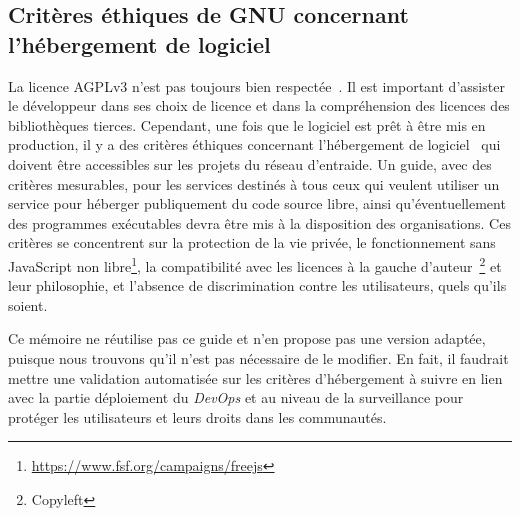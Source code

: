 
\subsection{Critères éthiques de GNU concernant l'hébergement de logiciel}

La licence AGPLv3 n’est pas toujours bien respectée~\cite{violation_libre_2017}. Il est important d'assister le développeur dans ses choix de licence et dans la compréhension des licences des bibliothèques tierces. Cependant, une fois que le logiciel est prêt à être mis en production, il y a des critères éthiques concernant l'hébergement de logiciel~\cite{gnu_critere_hebergement_2022} qui doivent être accessibles sur les projets du réseau d’entraide. Un guide, avec des critères mesurables, pour les services destinés à tous ceux qui veulent utiliser un service pour héberger publiquement du code source libre, ainsi qu'éventuellement des programmes exécutables devra être mis à la disposition des organisations. Ces critères se concentrent sur la protection de la vie privée, le fonctionnement sans JavaScript non libre\footnote{\url{https://www.fsf.org/campaigns/freejs}}, la compatibilité avec les licences à la gauche d'auteur~\footnote{Copyleft} et leur philosophie, et l'absence de discrimination contre les utilisateurs, quels qu'ils soient.

Ce mémoire ne réutilise pas ce guide et n'en propose pas une version adaptée, puisque nous trouvons qu'il n'est pas nécessaire de le modifier. En fait, il faudrait mettre une validation automatisée sur les critères d'hébergement à suivre en lien avec la partie déploiement du \textit{DevOps} et au niveau de la surveillance pour protéger les utilisateurs et leurs droits dans les communautés.

